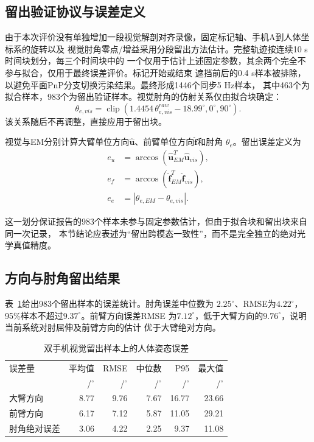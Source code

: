\subsection{留出验证协议与误差定义}
\label{subsec:ch7_visual_holdout}

由于本次评价没有单独增加一段视觉解剖对齐录像，固定标记轴、手机A到人体坐标系的旋转以及
视觉肘角零点/增益采用分段留出方法估计。完整轨迹按连续10 s时间块划分，每三个时间块中的
一个仅用于估计上述固定参数，其余两个完全不参与拟合，仅用于最终误差评价。标记开始或结束
遮挡前后的0.4 s样本被排除，以避免平面PnP分支切换污染结果。最终形成1446个同步5 Hz样本，
其中463个为拟合样本，983个为留出验证样本。视觉肘角的仿射关系仅由拟合块确定：
\begin{equation}
  \theta_{e,vis}=\operatorname{clip}
  \left(1.4454\,\theta_{e,vis}^{raw}-18.99^\circ,0^\circ,90^\circ\right).
  \label{eq:ch7_visual_elbow_calibration}
\end{equation}
该关系随后不再调整，直接应用于留出块。

视觉与EM分别计算大臂单位方向$\hat{\mathbf u}$、前臂单位方向$\hat{\mathbf f}$和肘角
$\theta_e$。留出误差定义为
\begin{align}
  e_u &= \arccos\!\left(\hat{\mathbf u}_{EM}^{T}\hat{\mathbf u}_{vis}\right), \\
  e_f &= \arccos\!\left(\hat{\mathbf f}_{EM}^{T}\hat{\mathbf f}_{vis}\right), \\
  e_e &= \left|\theta_{e,EM}-\theta_{e,vis}\right|.
  \label{eq:ch7_human_errors}
\end{align}

这一划分保证报告的983个样本未参与固定参数估计，但由于拟合块和留出块来自同一次记录，
本节结论应表述为“留出跨模态一致性”，而不是完全独立的绝对光学真值精度。

\subsection{方向与肘角留出结果}
\label{subsec:ch7_visual_results}

表~\ref{tab:ch7_visual_results}给出983个留出样本的误差统计。肘角误差中位数为
$2.25^\circ$、RMSE为$4.22^\circ$，95\%样本不超过$9.37^\circ$。前臂方向误差RMSE
为$7.12^\circ$，低于大臂方向的$9.76^\circ$，说明当前系统对肘屈伸及前臂方向的估计
优于大臂绝对方向。

\begin{table}[htbp]
  \centering
  \caption{双手机视觉留出样本上的人体姿态误差}
  \label{tab:ch7_visual_results}
  \begin{tabular}{@{}lrrrrr@{}}
    \toprule
    误差量 & 平均值 & RMSE & 中位数 & P95 & 最大值 \\
    & /$^\circ$ & /$^\circ$ & /$^\circ$ & /$^\circ$ & /$^\circ$ \\
    \midrule
    大臂方向 & 8.77 & 9.76 & 7.67 & 16.77 & 23.66 \\
    前臂方向 & 6.17 & 7.12 & 5.87 & 11.05 & 29.21 \\
    肘角绝对误差 & 3.06 & 4.22 & 2.25 & 9.37 & 11.08 \\
    \bottomrule
  \end{tabular}
\end{table}

